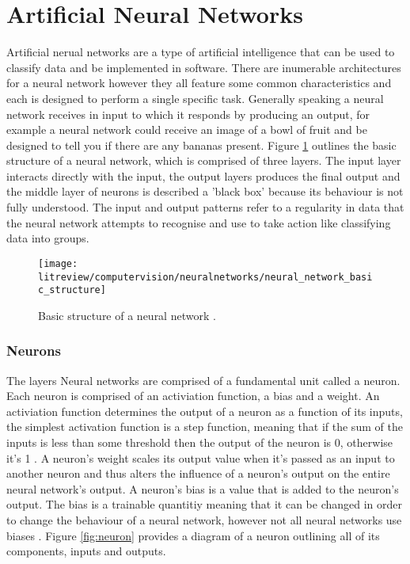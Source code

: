 \section{Artificial Neural Networks}

Artificial nerual networks are a type of artificial intelligence that can be used to classify data and be implemented in software. There are inumerable architectures for a neural network however they all feature some common characteristics and each is designed to perform a single specific task. Generally speaking a neural network receives in input to which it responds by producing an output, for example a neural network could receive an image of a bowl of fruit and be designed to tell you if there are any bananas present. Figure \ref{fig:neural_network} outlines the basic structure of a neural network, which is comprised of three layers. The input layer interacts directly with the input, the output layers produces the final output and the middle layer of neurons is described a 'black box' because its behaviour is not fully understood. The input and output patterns refer to a regularity in data that the neural network attempts to recognise and use to take action like classifying data into groups\cite{statistical_pattern_recognition}. 


\begin{figure}[h]
    \centering
    \texttt{[image: litreview/computervision/neuralnetworks/neural\_network\_basic\_structure]}
    \caption{Basic structure of a neural network \cite{neural_networks}.}
    \label{fig:neural_network}
\end{figure}

\subsubsection{Neurons}

The layers Neural networks are comprised of a fundamental unit called a neuron. Each neuron is comprised of an activiation function, a bias and a weight. An activiation function determines the output of a neuron as a function of its inputs, the simplest activation function is a step function, meaning that if the sum of the inputs is less than some threshold then the output of the neuron is 0, otherwise it's 1 \cite{machine_learning_dictionary}. A neuron's weight scales its output value when it's passed as an input to another neuron and thus alters the influence of a neuron's output on the entire neural network's output. A neuron's bias is a value that is added to the neuron's output. The bias is a trainable quantitiy meaning that it can be changed in order to change the behaviour of a neural network, however not all neural networks use biases \cite{neural_networks}. Figure \ref{fig:neuron} provides a diagram of a neuron outlining all of its components, inputs and outputs. 


